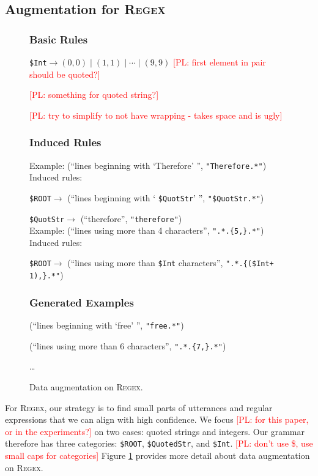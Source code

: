\documentclass[11pt,letterpaper]{article}
\newcommand{\regex}{\textsc{Regex}\xspace}
\newcommand{\catroot}{\texttt{\$ROOT}\xspace}
\newcommand{\catquotstr}{\texttt{\$QuotStr}\xspace}
\newcommand{\catint}{\texttt{\$Int}\xspace}
\newcommand\pl[1]{\textcolor{red}{[PL: #1]}}
\begin{document}
\subsection{Augmentation for \regex}
\begin{figure}[t] 
\small
\begin{framed}
\footnotesize
\subsubsection*{Basic Rules}
\catint $\to (0, 0) \mid (1, 1) \mid \dotsb \mid (9, 9)$
\pl{first element in pair should be quoted?}

\pl{something for quoted string?}

\pl{try to simplify to not have wrapping - takes space and is ugly}

\subsubsection*{Induced Rules}
Example: (``lines beginning with `Therefore' '', \texttt{"Therefore.*"})\\
Induced rules:

\quad \catroot $\to$ (``lines beginning with ` \catquotstr ' '', \texttt{"}\catquotstr\texttt{.*"})

\quad \catquotstr $\to$ (``therefore'', \texttt{"therefore"}) \\

Example: (``lines using more than 4 characters'', \texttt{".*.\{5,\}.*"})\\
Induced rules:

\quad \catroot $\to$ (``lines using more than \catint characters'', \texttt{".*.\{(\catint + 1),\}.*"})

\subsubsection*{Generated Examples} 
(``lines beginning with `free' '', \texttt{"free.*"})

(``lines using more than 6 characters'', \texttt{".*.\{7,\}.*"})

\dots
\end{framed}
\caption{Data augmentation on \regex.}
\label{fig:augment-regex}
\end{figure}

For \regex, our strategy is to find small parts of
utterances and regular expressions that we can align with high confidence.
We focus \pl{for this paper, or in the experiments?} on two cases: quoted strings and integers.
Our grammar therefore has three categories: 
\texttt{\$ROOT}, \texttt{\$QuotedStr}, and \texttt{\$Int}.
\pl{don't use \$, use small caps for categories}
Figure \ref{fig:augment-regex}
provides more detail about data augmentation on \regex.
\end{document}
